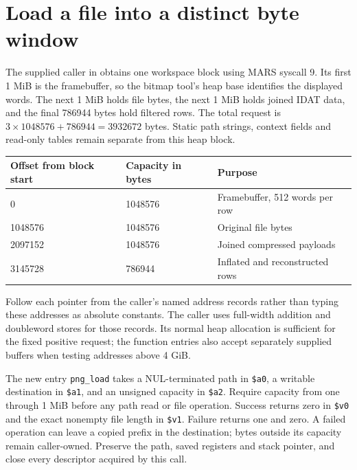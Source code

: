 \section{Load a file into a distinct byte window}
The supplied caller in  obtains one workspace
block using MARS syscall 9. Its first 1 MiB is the framebuffer, so the bitmap tool's
heap base identifies the displayed words. The next 1 MiB holds file bytes, the next
1 MiB holds joined IDAT data, and the final 786944 bytes hold filtered rows. The total
request is $3\times1048576+786944=3932672$ bytes. Static path strings, context fields
and read-only tables remain separate from this heap block.

\begin{longtable}{p{32mm}p{36mm}p{82mm}}
  \toprule Offset from block start & Capacity in bytes & Purpose                         \\\midrule
  0                                & 1048576           & Framebuffer, 512 words per row  \\
  1048576                          & 1048576           & Original file bytes             \\
  2097152                          & 1048576           & Joined compressed payloads      \\
  3145728                          & 786944            & Inflated and reconstructed rows \\\bottomrule
\end{longtable}
Follow each pointer from the caller's named address records rather than typing these
addresses as absolute constants. The caller uses full-width addition and doubleword
stores for those records. Its normal heap allocation is sufficient for the fixed
positive request; the function entries also accept separately supplied buffers when
testing addresses above 4 GiB.

The new entry \texttt{png\_load} takes a NUL-terminated path in \texttt{\$a0}, a writable
destination in \texttt{\$a1}, and an unsigned capacity in \texttt{\$a2}. Require capacity
from one through 1 MiB before any path read or file operation. Success returns zero
in \texttt{\$v0} and the exact nonempty file length in \texttt{\$v1}. Failure returns
one and zero. A failed operation can leave a copied prefix in the destination; bytes
outside its capacity remain caller-owned. Preserve the path, saved registers and
stack pointer, and close every descriptor acquired by this call.

